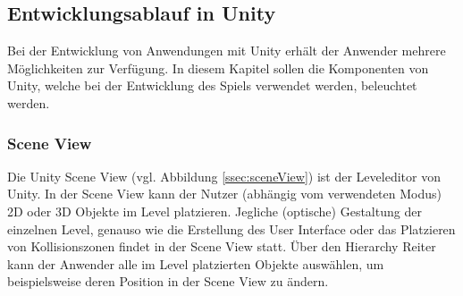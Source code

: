\subsection{Entwicklungsablauf in Unity}
Bei der Entwicklung von Anwendungen mit Unity erhält der Anwender mehrere Möglichkeiten zur Verfügung. In diesem Kapitel sollen die Komponenten von Unity, welche bei der Entwicklung des Spiels verwendet werden, beleuchtet werden.

\subsubsection{Scene View}
Die Unity Scene View (vgl. Abbildung \ref{ssec:sceneView}) ist der Leveleditor von Unity. In der Scene View kann der Nutzer (abhängig vom verwendeten Modus) 2D oder 3D Objekte im Level platzieren. Jegliche (optische) Gestaltung der einzelnen Level, genauso wie die Erstellung des User Interface oder das Platzieren von Kollisionszonen findet in der Scene View statt. Über den Hierarchy Reiter kann der Anwender alle im Level platzierten Objekte auswählen, um beispielsweise deren Position in der Scene View zu ändern.

